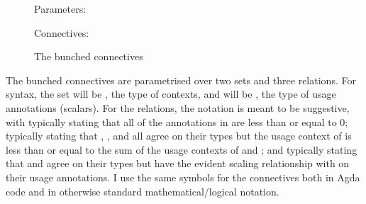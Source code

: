 \begin{figure}
  Parameters:

  Connectives:
  \vspace{-1em}
  \begin{multicols}{2}
    \noindent{}
    \noindent{}
    \columnbreak
    \AgdaNoSpaceAroundCode{}
    \noindent{}
    \vspace{-0.25em}
    \noindent{}
    \AgdaSpaceAroundCode{}
  \end{multicols}
  \vspace{-2em}
  \caption{The bunched connectives}
  \label{fig:bunched}
\end{figure}

The bunched connectives are parametrised over two sets and three relations.
For syntax, the set  will be , the type of
contexts, and  will be , the type of usage
annotations (scalars).
For the relations, the notation is meant to be suggestive, with
\AgdaBound{$\Gamma$}\AgdaSpace{} typically stating that all
of the annotations in \AgdaBound{$\Gamma$} are less than or equal to $0$;
\AgdaBound{$\Gamma$}\AgdaSpace{}\AgdaBound{$\leq$[}\AgdaSpace{}%
\AgdaBound{$\Delta$}\AgdaSpace{}\AgdaBound{+}\AgdaSpace{}\AgdaBound{$\Theta$}%
\AgdaSpace{}\AgdaBound{]}
typically stating that \AgdaBound{$\Gamma$}, \AgdaBound{$\Delta$}, and
\AgdaBound{$\Theta$} all agree on their types but the usage context of
\AgdaBound{$\Gamma$} is less than or equal to the sum of the usage contexts of
\AgdaBound{$\Delta$} and \AgdaBound{$\Theta$}; and
\AgdaBound{$\Gamma$}\AgdaSpace{}\AgdaBound{$\leq$[}\AgdaSpace{}%
\AgdaSpace{}\AgdaSpace{}\AgdaBound{$\Delta$}%
\AgdaSpace{}\AgdaBound{]}
typically stating that \AgdaBound{$\Gamma$} and \AgdaBound{$\Delta$} agree on
their types but have the evident scaling relationship with  on
their usage annotations.
I use the same symbols for the connectives both in Agda code and in otherwise
standard mathematical/logical notation.

